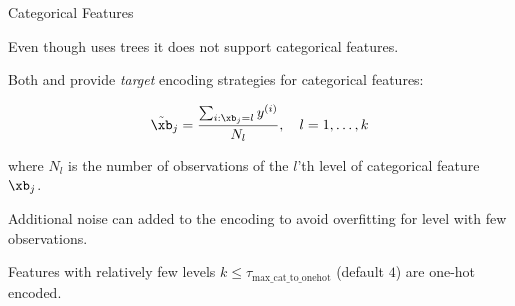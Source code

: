 \begin{vbframe}{Categorical Features}

Even though  uses trees it does not support categorical features.

\lz

Both  and  provide \emph{target} encoding strategies for categorical features:

$$
  \tilde \xb_j = \frac{\sum_{i:\xb_j=l}y^{(i)}}{N_l}, \quad l=1,\dots,k
$$

where $N_l$ is the number of observations of the $l$'th level of categorical feature $\xb_j$.

\lz

Additional noise can added to the encoding to avoid overfitting for level with few observations.

\lz

Features with relatively few levels $k \le \tau_\text{max\_cat\_to\_onehot}$ (default $4$) are one-hot encoded.

\end{vbframe}


